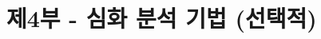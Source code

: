 \documentclass[
  letterpaper,
]{book}
\begin{document}
\chapter{}\label{section-7}

\chapter{}\label{section-8}

\chapter{}\label{section-9}

\part{제4부 - 심화 분석 기법 (선택적)}

\chapter{}\label{section-10}

\chapter{}\label{section-11}

\chapter{}\label{section-12}

\chapter{}\label{section-13}

\chapter{}\label{section-14}

\cleardoublepage
{}
{}
\appendix

\chapter{}\label{section-15}

\chapter{}\label{section-16}

\chapter{}\label{section-17}


\backmatter
\end{document}
